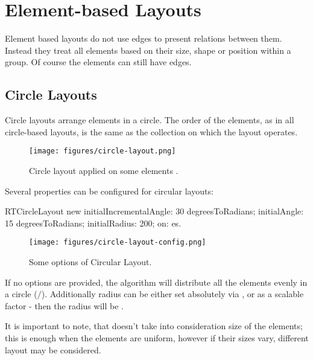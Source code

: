 \documentclass[a4paper,10pt,twoside]{book}
\begin{document}
\section{ Element-based Layouts}
Element based layouts do not use edges to present relations between them. Instead they treat all elements based on their size, shape or position within a group. Of course the elements can still have edges.
\subsection{ Circle Layouts}
Circle layouts arrange elements in a circle. The order of the elements, as in all circle-based layouts, is the same as the collection on which the layout operates.


\begin{figure}

\begin{center}
\texttt{[image: figures/circle-layout.png]}\caption{Circle layout applied on some elements .\label{circle-layout}}\end{center}
\end{figure}


Several properties can be configured for circular layouts:


\begin{code}{}
RTCircleLayout new
	initialIncrementalAngle: 30 degreesToRadians;
	initialAngle: 15 degreesToRadians;
	initialRadius: 200;
	on: es.
\end{code}



\begin{figure}

\begin{center}
\texttt{[image: figures/circle-layout-config.png]}\caption{Some options of Circular Layout.\label{circle-layout-config}}\end{center}
\end{figure}


If no options are provided, the algorithm will distribute all the elements evenly in a circle ($/$). Additionally radius can be either set absolutely via , or as a scalable factor  - then the radius will be .

It is important to note, that  doesn't take into consideration size of the elements; this is enough when the elements are uniform, however if their sizes vary, different layout may be considered.
\end{document}
